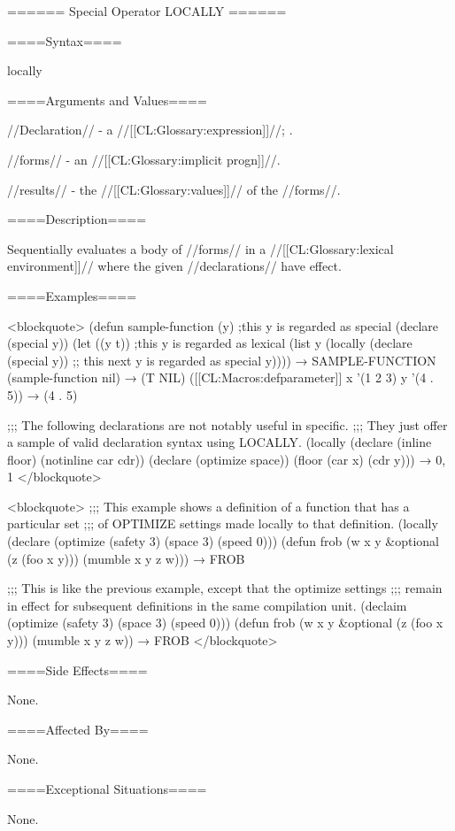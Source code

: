 ====== Special Operator LOCALLY ======

====Syntax====

\DefspecWithValues locally { } {}

====Arguments and Values====

//Declaration// - a  //[[CL:Glossary:expression]]//; \noeval.

//forms// - an //[[CL:Glossary:implicit progn]]//.

//results// - the //[[CL:Glossary:values]]// of the //forms//.

====Description====

Sequentially evaluates a body of //forms// in a //[[CL:Glossary:lexical environment]]// where the given //declarations// have effect.

====Examples====

<blockquote> (defun sample-function (y) ;this y is regarded as special (declare (special y)) (let ((y t)) ;this y is regarded as lexical (list y (locally (declare (special y)) ;; this next y is regarded as special y)))) → SAMPLE-FUNCTION (sample-function nil) → (T NIL) ([[CL:Macros:defparameter]] x '(1 2 3) y '(4 . 5)) → (4 . 5)

;;; The following declarations are not notably useful in specific. ;;; They just offer a sample of valid declaration syntax using LOCALLY. (locally (declare (inline floor) (notinline car cdr)) (declare (optimize space)) (floor (car x) (cdr y))) → 0, 1 </blockquote>

<blockquote> ;;; This example shows a definition of a function that has a particular set ;;; of OPTIMIZE settings made locally to that definition. (locally (declare (optimize (safety 3) (space 3) (speed 0))) (defun frob (w x y &optional (z (foo x y))) (mumble x y z w))) → FROB

;;; This is like the previous example, except that the optimize settings ;;; remain in effect for subsequent definitions in the same compilation unit. (declaim (optimize (safety 3) (space 3) (speed 0))) (defun frob (w x y &optional (z (foo x y))) (mumble x y z w)) → FROB </blockquote>

====Side Effects====

None.

====Affected By====

None.

====Exceptional Situations====

None.

